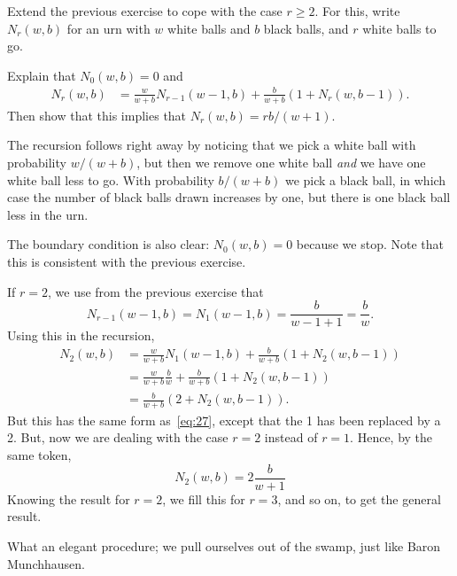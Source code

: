 \begin{exercise}
Extend the previous exercise to cope with the case $r\geq 2$.
For this, write $N_{r}(w,b)$ for an urn with $w$ white balls and $b$ black balls, and $r$ white balls to go.
\begin{hint}
Explain that $N_{0}(w,b) = 0$ and
\begin{align}
  N_r(w,b) &= \frac{w}{w+b} N_{r-1}(w-1, b) +  \frac{b}{w+b} (1+N_{r}(w, b-1)).
\end{align}
Then show that this implies that $N_{r}(w,b) = r b/ (w+1)$.
\end{hint}
\begin{solution}
The recursion follows right away by noticing that we pick a white ball with probability $w/(w+b)$, but then we remove one white ball \emph{and} we have one white ball less to go.
With probability $b/(w+b)$ we pick a black ball, in which case the number of black balls drawn increases by one, but there is one black ball less in the urn.

The boundary condition is also clear: $N_{0}(w,b)=0$ because we stop.
Note that this is consistent with the previous exercise.

If $r=2$, we use from the previous exercise that
\begin{equation*}
N_{r-1}(w-1, b) = N_{1}(w-1, b) = \frac{b }{w-1 + 1} = \frac{b }{w}.
\end{equation*}
Using this in the recursion,
\begin{align*}
  N_2(w,b)
&= \frac{w}{w+b} N_{1}(w-1, b) +  \frac{b}{w+b} (1+N_{2}(w, b-1)) \\
&= \frac{w}{w+b} \frac{b }{w} +  \frac{b}{w+b} (1+N_{2}(w, b-1)) \\
&=  \frac{b}{w+b} (2+N_{2}(w, b-1)).
\end{align*}
But this has the same form as~\cref{eq:27}, except that the 1 has been replaced by a 2. But, now we are dealing with the case $r=2$ instead of $r=1$. Hence, by the same token,
\begin{equation*}
  N_2(w,b) = 2 \frac{b}{w+1}
\end{equation*}
Knowing the result for $r=2$, we fill this for $r=3$, and so on, to get the general result.

What an elegant procedure;  we pull ourselves out of the swamp, just like Baron Munchhausen.
\end{solution}
\end{exercise}

